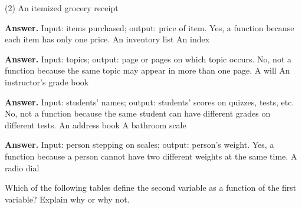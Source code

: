 \documentclass[10pt,]{book}
\theoremstyle{plain}
\theoremstyle{definition}
\theoremstyle{definition}
\theoremstyle{definition}
\theoremstyle{definition}
\numberwithin{equation}{part}
\begin{document}
\begin{exercisegroup}(2)
\exercise[7.]\hypertarget{exercise-76}{}An itemized grocery receipt%
\par\smallskip
\noindent\textbf{Answer.}\hypertarget{answer-47}{}\quad
Input: items purchased; output: price of item. Yes, a function because each item has only one price.%
\exercise[8.]\hypertarget{exercise-77}{}An inventory list%
\exercise[9.]\hypertarget{exercise-78}{}An index%
\par\smallskip
\noindent\textbf{Answer.}\hypertarget{answer-48}{}\quad
Input: topics; output: page or pages on which topic occurs. No, not a function because the same topic may appear in more than one page.%
\exercise[10.]\hypertarget{exercise-79}{}A will%
\exercise[11.]\hypertarget{exercise-80}{}An instructor's grade book%
\par\smallskip
\noindent\textbf{Answer.}\hypertarget{answer-49}{}\quad
Input: students’ names; output: students’ scores on quizzes, tests, etc. No, not a function because the same student can have different grades on different tests.%
\exercise[12.]\hypertarget{exercise-81}{}An address book%
\exercise[13.]\hypertarget{exercise-82}{}A bathroom scale%
\par\smallskip
\noindent\textbf{Answer.}\hypertarget{answer-50}{}\quad
Input: person stepping on scales; output: person's weight. Yes, a function because a person cannot have two different weights at the same time.%
\exercise[14.]\hypertarget{exercise-83}{}A radio dial%
\end{exercisegroup}
\par\smallskip\noindent
\hypertarget{exercisegroup-9}{}\par\noindent Which of the following tables define the second variable as a function of the first variable? Explain why or why not.%
\end{document}

